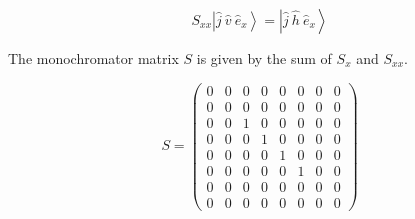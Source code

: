 \documentclass[12pt, twoside]{article}
\numberwithin{equation}{section}
\begin{document}
\[ S_{xx} \left| \hat{j} \ \hat{v} \ \hat{e}_{x} \right\rangle = \left| \hat{j} \ \hat{h} \ \hat{e}_{x} \right\rangle\]

The monochromator matrix $S$ is given by the sum of $S_x$ and $S_{xx}$.

\[S = \begin{pmatrix} 0& 0& 0& 0& 0& 0& 0& 0\\0& 0& 0& 0& 0& 0& 0& 0\\0& 0& 1& 0& 0& 0& 0& 0\\0& 0& 0& 1& 0& 0& 0& 0\\0& 0& 0& 0& 1& 0& 0& 0\\0& 0& 0& 0& 0& 1& 0& 0\\0& 0& 0& 0& 0& 0& 0& 0\\0& 0& 0& 0& 0& 0& 0& 0 \end{pmatrix}\]

\newpage

\end{document}
